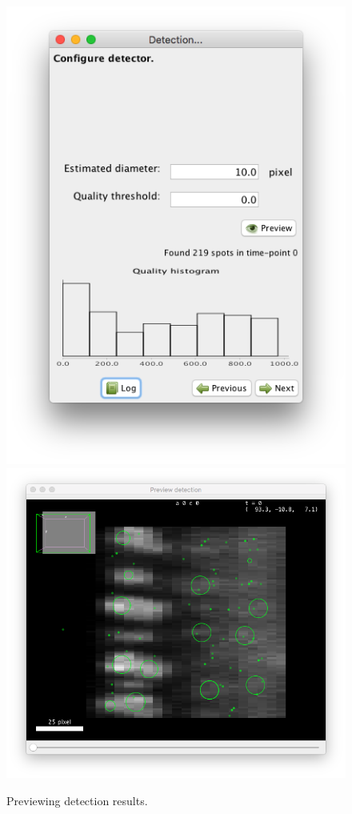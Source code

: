 \begin{figure}
    \centering
         \includegraphics[height=0.25\textheight]{figures/Mastodon_DoGconfig1.png}
         \includegraphics[height=0.25\textheight]{figures/Mastodon_DoGconfig2.png}
    \caption{Previewing detection results.}
    \label{fig:PreviewDetection}
\end{figure}

